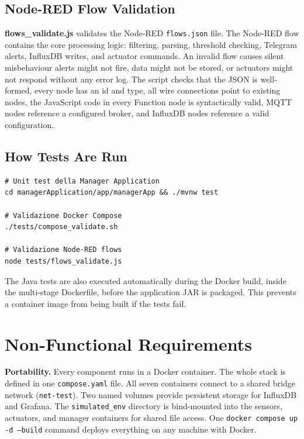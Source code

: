 \documentclass[a4paper,12pt]{report}
\begin{document}
\section*{Node-RED Flow Validation}

\textbf{flows\_validate.js} validates the Node-RED \texttt{flows.json} file.
The Node-RED flow contains the core processing logic: filtering, parsing,
threshold checking, Telegram alerts, InfluxDB writes, and actuator commands.
An invalid flow causes silent misbehaviour alerts might not fire, data
might not be stored, or actuators might not respond without any error
log. The script checks that the JSON is well-formed, every node has an id and
type, all wire connections point to existing nodes, the JavaScript code in
every Function node is syntactically valid, MQTT nodes reference a configured
broker, and InfluxDB nodes reference a valid configuration.

\section*{How Tests Are Run}

\begin{lstlisting}[caption=Comandi per eseguire i test]
# Unit test della Manager Application
cd managerApplication/app/managerApp && ./mvnw test

# Validazione Docker Compose
./tests/compose_validate.sh

# Validazione Node-RED flows
node tests/flows_validate.js
\end{lstlisting}

The Java tests are also executed automatically during the Docker build, inside
the multi-stage Dockerfile, before the application JAR is packaged. This
prevents a container image from being built if the tests fail.

\chapter*{Non-Functional Requirements}

\textbf{Portability.} Every component runs in a Docker container. The whole
stack is defined in one \texttt{compose.yaml} file. All seven containers
connect to a shared bridge network (\texttt{net-test}). Two named volumes
provide persistent storage for InfluxDB and Grafana. The
\texttt{simulated\_env} directory is bind-mounted into the sensors, actuators,
and manager containers for shared file access. One
\texttt{docker compose up -d --build} command deploys everything on any
machine with Docker.
\end{document}

